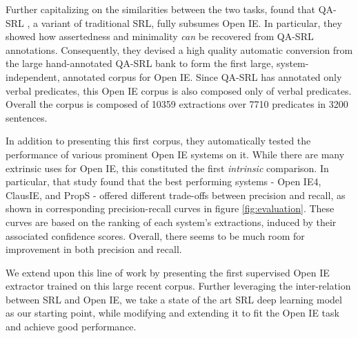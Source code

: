 
Further capitalizing on the similarities between the two tasks,  found that QA-SRL \cite{hequestion}, a variant of traditional SRL, fully subsumes Open IE. In particular, they showed how assertedness and minimality \emph{can} be recovered from QA-SRL annotations. Consequently, they devised a high quality automatic conversion from the large hand-annotated QA-SRL bank to form the first
large, system-independent, annotated corpus for Open IE.
Since QA-SRL has annotated only verbal predicates, this Open IE corpus is also composed only of verbal predicates.
Overall the corpus is composed of 10359 extractions over 7710 predicates in 3200 sentences.



In addition to presenting this first corpus, they automatically tested the performance of various prominent
Open IE systems on it. While there are many extrinsic uses for Open IE, this
constituted the first \emph{intrinsic} comparison.
In particular, that study found that the best performing systems - Open IE4, ClausIE, and PropS - 
offered different trade-offs between precision and recall, as shown in  corresponding precision-recall curves in figure \ref{fig:evaluation}. These curves are based on the ranking of each system's extractions, induced by their associated confidence scores.
Overall, there seems to be much room for improvement in both precision and recall.

We extend upon this line of work by presenting the first 
supervised Open IE extractor trained on
this large recent corpus.
Further leveraging the inter-relation between SRL and Open IE, we take  a state of the art SRL deep learning model as our starting point,
while modifying and extending it to fit the Open IE task and achieve good performance.


